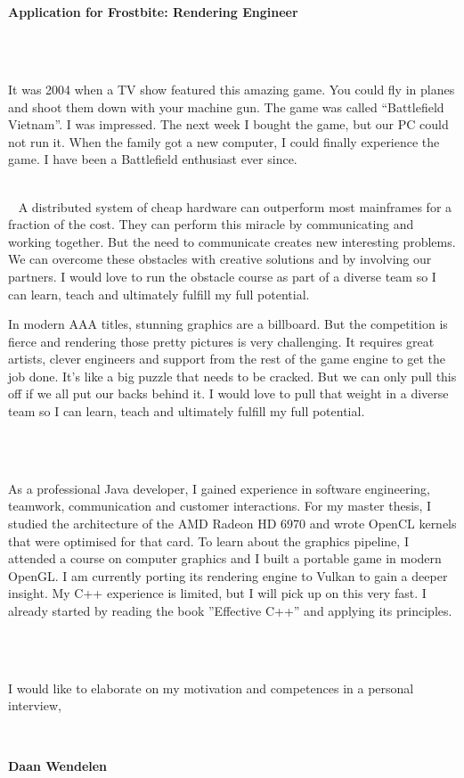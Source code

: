 \documentclass[11pt,a4paper,arial]{moderncv}        %
\begin{document}
\date{2016-10-18}

\makelettertitle

~\\
~

\textbf {Application for Frostbite: Rendering Engineer}

~\\
~

It was 2004 when a TV show featured this amazing game. You could fly in planes and shoot them down with your machine gun. The game was
called ``Battlefield Vietnam''. I was impressed. The next week I bought the game, but our PC could not run it.
When the family got a new computer, I could finally experience the game. I have been a Battlefield enthusiast ever since.

~\\
~
A distributed system of cheap hardware can outperform most mainframes for a fraction of the cost.
They can perform this miracle by communicating and working together. But the need to communicate creates new interesting problems.
We can overcome these obstacles with creative solutions and by involving our partners. I would love to run the obstacle course
as part of a diverse team so I can learn, teach and ultimately fulfill my full potential.


In modern AAA titles, stunning graphics are a billboard. But the competition is fierce and rendering those pretty pictures
is very challenging. It requires great artists, clever engineers and support from the rest of the game engine to get the job done. It's like a big puzzle
that needs to be cracked. But we can only pull this off if we all put our backs behind it. I would love to pull that weight in a diverse team so
I can learn, teach and ultimately fulfill my full potential.

~\\
~

As a professional Java developer, I gained experience in software engineering, teamwork, communication and customer interactions. For my master thesis, I studied
the architecture of the AMD Radeon HD 6970 and wrote OpenCL kernels that were optimised for that card. To learn about the graphics pipeline, I attended a course
on computer graphics and I built a portable game in modern OpenGL. I am currently porting its rendering engine to Vulkan to gain a deeper insight. My C++ experience is limited,
but I will pick up on this very fast. I already started by reading the book ''Effective C++'' and applying its principles.

~\\
~

I would like to elaborate on my motivation and competences in a personal interview,


~

\textbf {Daan Wendelen}

\makeletterclosing
\end{document}
